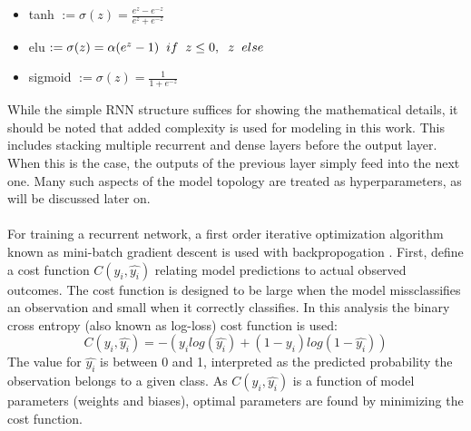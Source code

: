 \documentclass[11pt]{article}
\begin{document}
\begin{multicols*}{2}
                    \begin{itemize}
                        \item tanh $:= \sigma(z) = \frac{e^z - e^{-z}}{e^z + e^{-z}}$ 
                        \item elu $:= \sigma(z) = \alpha(e^z - 1) \hspace{0.2cm} if \hspace{0.2cm} z \le 0, \hspace{0.2cm} z \hspace{0.2cm} else$
                        \item sigmoid $:= \sigma(z) = \frac{1}{1 + e^{-z}}$
                    \end{itemize} 

                    While the simple RNN structure suffices for showing the mathematical details, it should be noted that added complexity is used for modeling in this work.
                    This includes stacking multiple recurrent and dense layers before the output layer. 
                    When this is the case, the outputs of the previous layer simply feed into the next one.
                    Many such aspects of the model topology are treated as hyperparameters, as will be discussed later on.
                
                \vspace{-10pt}

                \paragraph{}    
                    For training a recurrent network, a first order iterative optimization algorithm known as mini-batch gradient descent is used with backpropogation \cite{Mozer95}. 
                    First, define a cost function $C(y_i, \hat{y_i})$ relating model predictions to actual observed outcomes. 
                    The cost function is designed to be large when the model missclassifies an observation and small when it correctly classifies. 
                    In this analysis the binary cross entropy (also known as log-loss) cost function is used: $$C(y_i, \hat{y_i}) = -(y_i log(\hat{y_i}) + (1 - y_i)log(1 - \hat{y_i}))$$
                    The value for $\hat{y_i}$ is between 0 and 1, interpreted as the predicted probability the observation belongs to a given class.
                    As $C(y_i, \hat{y_i})$ is a function of model parameters (weights and biases), optimal parameters are found by minimizing the cost function.
                    

\end{multicols*}
\end{document}
